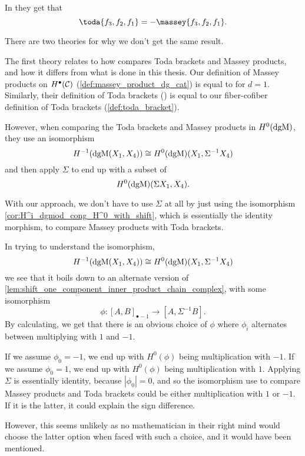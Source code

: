 \begin{remark}
    In \cite[Theorem 4.2.6]{Jasso-Muro_2023} they get that
    \[
        \toda{f_3, f_2, f_1} = -\massey{f_3, f_2, f_1}.
    \]

    There are two theories for why we don't get the same result.
    
    The first theory relates to how \cite{Jasso-Muro_2023} compares Toda brackets and Massey products, and how it differs from what is done in this thesis. Our definition of Massey products on \( H^{\bullet}({\mathcal{C}}) \) (\autoref{def:massey_product_dg_cat}) is equal to \cite[Definition 4.2.1]{Jasso-Muro_2023} for \( d = 1 \). Similarly, their definition of Toda brackets (\cite[Definition 4.1.6]{Jasso-Muro_2023}) is equal to our fiber-cofiber definition of Toda brackets (\autoref{def:toda_bracket}).
    
    However, when comparing the Toda brackets and Massey products in \( H^0(\operatorname{dgM}) \), they use an isomorphism
    \[
        H^{-1}(\operatorname{dgM}(X_1, X_4)) \cong H^0(\operatorname{dgM})(X_1, \Sigma^{-1} X_4)
    \]
    and then apply \( \Sigma \) to end up with a subset of
    \[
        H^0(\operatorname{dgM})(\Sigma X_1, X_4).
    \] 

    With our approach, we don't have to use \( \Sigma \) at all by just using the isomorphism \autoref{cor:H^i_dgmod_cong_H^0_with_shift}, which is essentially the identity morphism, to compare Massey products with Toda brackets.

    In trying to understand the isomorphism,
    \[
        H^{-1}(\operatorname{dgM}(X_1, X_4)) \cong H^0(\operatorname{dgM})(X_1, \Sigma^{-1} X_4)
    \]
    we see that it boils down to an alternate version of \autoref{lem:shift_one_component_inner_product_chain_complex}, with some isomorphism
    \[
        \phi: [A, B]_{\bullet - 1} \to [A, \Sigma^{-1} B].
    \]
    By calculating, we get that there is an obvious choice of \( \phi \) where \( \phi_i \) alternates between multiplying with \( 1 \) and \( -1 \).

    If we assume \( \phi_0 = -1 \), we end up with \( H^0(\phi) \) being multiplication with \( -1 \). If we assume \( \phi_0 = 1 \), we end up with \( H^0(\phi) \) being multiplication with \( 1 \). Applying \( \Sigma \) is essentially identity, because \( |\phi_0| = 0 \), and so the isomorphism \cite{Jasso-Muro_2023} use to compare Massey products and Toda brackets could be either multiplication with \( 1 \) or \( -1 \). If it is the latter, it could explain the sign difference.

    However, this seems unlikely as no mathematician in their right mind would choose the latter option when faced with such a choice, and it would have been mentioned.


\end{remark}
